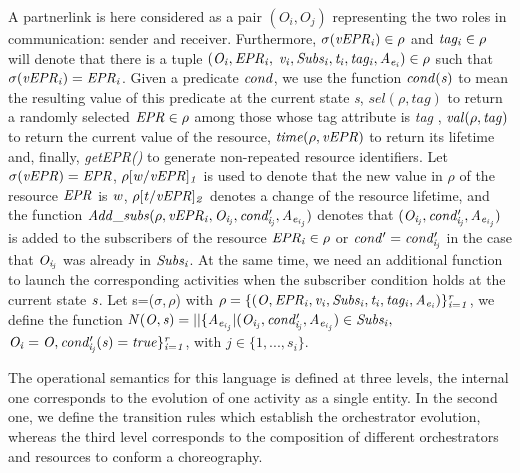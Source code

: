 A partnerlink is here considered as a pair $(O_i,O_j)$ representing the two roles in communication: sender and receiver. Furthermore, $\it{\sigma(vEPR_i) \in \rho}$ and $\it{tag_i \in \rho}$ will denote that there is a tuple $\it{(O_i,EPR_i,}$ ${\it v_i,Subs_i,t_i,tag_i,A_{e{_i}}) \in \rho}$ such that $\it{\sigma(vEPR_i)=EPR_i}$. Given a predicate $\it{cond}$, we use the function $\it{cond(s)}$ to mean the resulting value of this predicate at the current state {\it s}, {\it $sel(\rho,tag)$} to return a randomly selected ${\it EPR \in \rho}$ among those whose tag attribute is {\em tag} , ${\it val(\rho,tag)}$ to return the current value of the resource, ${\it time(\rho,vEPR)}$ to return its lifetime and, finally, {\it getEPR()} to generate non-repeated resource identifiers. Let ${\it \sigma(vEPR)=EPR}$, ${\it \rho[w/vEPR]_1}$ is used to denote that the new value in $\rho$ of the resource $\it{EPR}$ is $\it{w}$, $\it{\rho[t/vEPR]_2}$ denotes a change of the resource lifetime, and the function $\it{Add\_subs(\rho,vEPR_i,O_{i_{j}},cond'_{i_{j}},A_{e{_i{_{_j}}}})}$ denotes that $\it{(O_{i_{j}},cond'_{i_{j}},A_{e{_i{_{_j}}}})}$ is added to the subscribers of the resource $\it{EPR_i \in \rho}$ or ${\it cond'=cond'_{i_{j}}}$ in the case that $\it{O_{i_{j}}}$ was already in ${\it Subs_i}$.
At the same time, we need an additional function to launch the corresponding activities %
when the subscriber condition holds at the current state ${\it s}$. Let s=($\sigma, \rho$) with $\it{ \rho=\{(O,EPR_i,v_i,Subs_i,t_i,tag_i,A_{e{_i}})\}_{i=1}^r}$, we define the function ${\it N(O,s)=||\{A_{e{_i{_{_j}}}}|(O_{i{_j}},cond'_{i_{j}},A_{e{_i{_{_j}}}}) \in Subs_i,}$
${\it O_{i}=O, cond'_{i_{j}}(s)=true\}_{i=1}^r}$, with $j \in \{1,...,s_i\}$.

The operational semantics for this language is defined at three levels, the internal one corresponds to the evolution of one activity as a single entity. In the second one, we define
the transition rules which establish the orchestrator evolution, whereas the third level corresponds to the composition
of different orchestrators and resources to conform a choreography.




